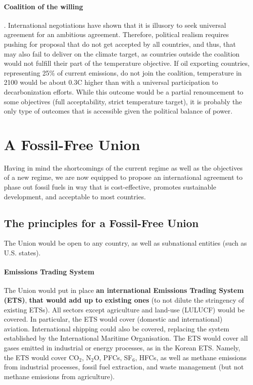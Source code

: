 \documentclass[12pt,english]{article}
\begin{document}
\paragraph{Coalition of the willing}. International negotiations have shown that it is illusory to seek universal agreement for an ambitious agreement. Therefore, political realism requires pushing for proposal that do not get accepted by all countries, and thus, that may also fail to deliver on the climate target, as countries outside the coalition would not fulfill their part of the temperature objective. If oil exporting countries, representing 25\% of current emissions, do not join the coalition, temperature in 2100 would be about 0.3\textdegree{}C higher than with a universal participation to decarbonization efforts. While this outcome would be a partial renouncement to some objectives (full acceptability, strict temperature target), it is probably the only type of outcomes that is accessible given the political balance of power.

\clearpage
\section{A Fossil-Free Union\label{sec:ffu}}

Having in mind the shortcomings of the current regime as well as the objectives of a new regime, we are now equipped to propose an international agreement to phase out fossil fuels in way that is cost-effective, promotes sustainable development, and acceptable to most countries. %

\subsection{The principles for a Fossil-Free Union\label{subsec:principles}}

The Union would be open to any country, as well as subnational entities (such as U.S. states). 

\paragraph{Emissions Trading System}
The Union would put in place \textbf{an international Emissions Trading System (ETS)}, \textbf{that would add up to existing ones} (to not dilute the stringency of existing ETSs). All sectors except agriculture and land-use (LULUCF) would be covered. In particular, the ETS would cover (domestic and international) aviation. International shipping could also be covered, replacing the system established by the International Maritime Organisation. The ETS would cover all gases emitted in industrial or energy processes, as in the Korean ETS. Namely, the ETS would cover CO$_\text{2}$, N$_\text{2}$O, PFCs, SF$_\text{6}$, HFCs, as well as methane emissions from industrial processes, fossil fuel extraction, and waste management (but not methane emissions from agriculture). %
\end{document}

